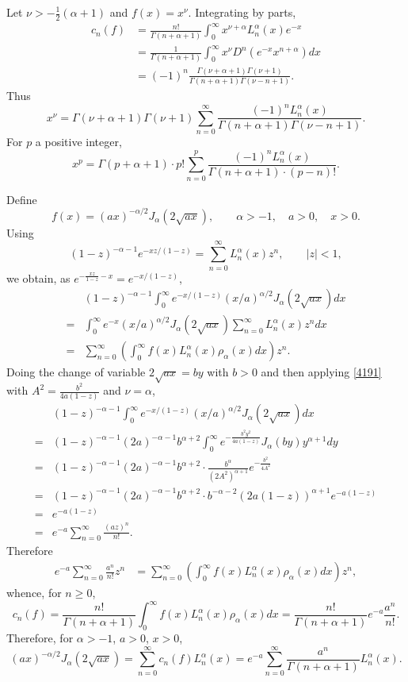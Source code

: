 \documentclass{article}
\theoremstyle{definition}
\begin{document}
Let $\nu>-\frac{1}{2}(\alpha+1)$ and $f(x)=x^\nu$. 
Integrating by parts,
\begin{align*}
c_n(f)&=\frac{n!}{\Gamma(n+\alpha+1)} \int_0^\infty x^{\nu+\alpha} L_n^\alpha(x) e^{-x} \\
&=\frac{1}{\Gamma(n+\alpha+1)} \int_0^\infty x^\nu D^n(e^{-x}x^{n+\alpha}) dx\\
&=(-1)^n \frac{\Gamma(\nu+\alpha+1)\Gamma(\nu+1)}{\Gamma(n+\alpha+1)\Gamma(\nu-n+1)}.
\end{align*}
Thus
\[
x^\nu = \Gamma(\nu+\alpha+1)\Gamma(\nu+1) \sum_{n=0}^\infty \frac{(-1)^n L_n^\alpha(x)}{\Gamma(n+\alpha+1)
\Gamma(\nu-n+1)}.
\]
For $p$ a positive integer,
\[
x^p = \Gamma(p+\alpha+1) \cdot p! \sum_{n=0}^p \frac{(-1)^n L_n^\alpha(x)}{\Gamma(n+\alpha+1) \cdot (p-n)!}.
\]

Define
\[
f(x)=(ax)^{-\alpha/2} J_\alpha(2\sqrt{ax}),\qquad \alpha>-1,\quad a>0,\quad x>0.
\]
Using 
\[
(1-z)^{-\alpha-1} e^{-xz/(1-z)} = \sum_{n=0}^\infty L_n^\alpha(x) z^n,\qquad
|z|<1,
\]
we obtain, as $e^{-\frac{xz}{1-z}-x}= e^{-x/(1-z)}$,
\[
\begin{split}
&(1-z)^{-\alpha-1} \int_0^\infty e^{-x/(1-z)} (x/a)^{\alpha/2} J_\alpha(2\sqrt{ax}) dx\\
=&\int_0^\infty e^{-x} (x/a)^{\alpha/2} J_\alpha(2\sqrt{ax}) \sum_{n=0}^\infty L_n^\alpha(x) z^n dx\\
=&\sum_{n=0}^\infty \left(\int_0^\infty f(x) L_n^\alpha(x) \rho_\alpha(x) dx\right) z^n.
\end{split}
\]
Doing the change of variable $2\sqrt{ax}=by$ with $b>0$ and then applying \eqref{4191} with
$A^2=\frac{b^2}{4a(1-z)}$ and $\nu=\alpha$,
\[
\begin{split}
&(1-z)^{-\alpha-1} \int_0^\infty e^{-x/(1-z)} (x/a)^{\alpha/2} J_\alpha(2\sqrt{ax}) dx\\
=&(1-z)^{-\alpha-1} (2a)^{-\alpha-1} b^{\alpha+2} \int_0^\infty e^{-\frac{b^2 y^2}{4a(1-z)}} 
J_\alpha(by) y^{\alpha+1} dy\\
=&(1-z)^{-\alpha-1} (2a)^{-\alpha-1} b^{\alpha+2} \cdot \frac{b^\alpha}{(2A^2)^{\alpha+1}} e^{-\frac{b^2}{4A^2}}\\
=&(1-z)^{-\alpha-1} (2a)^{-\alpha-1} b^{\alpha+2} \cdot b^{-\alpha-2} (2a(1-z))^{\alpha+1} e^{-a(1-z)}\\
=& e^{-a(1-z)}\\
=&e^{-a} \sum_{n=0}^\infty \frac{(az)^n}{n!}.
\end{split}
\]
Therefore
\begin{align*}
e^{-a} \sum_{n=0}^\infty \frac{a^n}{n!} z^n&=\sum_{n=0}^\infty \left(\int_0^\infty f(x) L_n^\alpha(x) \rho_\alpha(x) dx\right) z^n,
\end{align*}
whence, for $n \geq 0$,
\[
c_n(f) = \frac{n!}{\Gamma(n+\alpha+1)} \int_0^\infty f(x) L_n^\alpha(x) \rho_\alpha(x) dx
=\frac{n!}{\Gamma(n+\alpha+1)} e^{-a} \frac{a^n}{n!}.
\]
Therefore, for $\alpha>-1$, $a>0$, $x>0$,
\[
(ax)^{-\alpha/2} J_\alpha(2\sqrt{ax}) = \sum_{n=0}^\infty c_n(f) L_n^\alpha(x)
=e^{-a} \sum_{n=0}^\infty \frac{a^n}{\Gamma(n+\alpha+1)} L_n^\alpha(x).
\]
\end{document}
